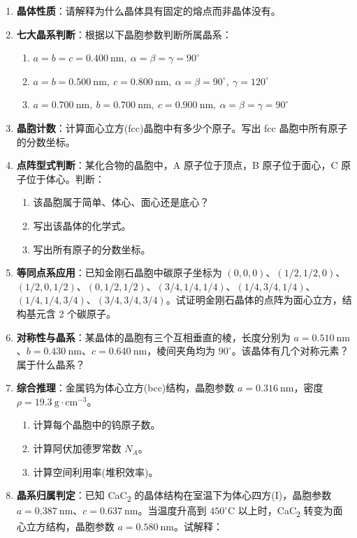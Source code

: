\begin{enumerate}
\def\labelenumi{\arabic{enumi}.}
\item
  \textbf{晶体性质}：请解释为什么晶体具有固定的熔点而非晶体没有。
\item
  \textbf{七大晶系判断}：根据以下晶胞参数判断所属晶系：

  \begin{enumerate}
  \def\labelenumii{(\arabic{enumii})}
  \tightlist
  \item
    \(a = b = c = 0.400\ \mathrm{nm},\ \alpha = \beta = \gamma = 90^\circ\)
  \item
    \(a = b = 0.500\ \mathrm{nm},\ c = 0.800\ \mathrm{nm},\ \alpha = \beta = 90^\circ,\ \gamma = 120^\circ\)
  \item
    \(a = 0.700\ \mathrm{nm},\ b = 0.700\ \mathrm{nm},\ c = 0.900\ \mathrm{nm},\ \alpha = \beta = \gamma = 90^\circ\)
  \end{enumerate}
\item
  \textbf{晶胞计数}：计算面心立方(fcc)晶胞中有多少个原子。写出 fcc 晶胞中所有原子的分数坐标。
\item
  \textbf{点阵型式判断}：某化合物的晶胞中，A 原子位于顶点，B 原子位于面心，C 原子位于体心。判断：

  \begin{enumerate}
  \def\labelenumii{(\arabic{enumii})}
  \tightlist
  \item
    该晶胞属于简单、体心、面心还是底心？
  \item
    写出该晶体的化学式。
  \item
    写出所有原子的分数坐标。
  \end{enumerate}
\item
  \textbf{等同点系应用}：已知金刚石晶胞中碳原子坐标为 \((0, 0, 0)\)、\((1/2, 1/2, 0)\)、\((1/2, 0, 1/2)\)、\((0, 1/2, 1/2)\)、\((3/4, 1/4, 1/4)\)、\((1/4, 3/4, 1/4)\)、\((1/4, 1/4, 3/4)\)、\((3/4, 3/4, 3/4)\)。试证明金刚石晶体的点阵为面心立方，结构基元含 2 个碳原子。
\item
  \textbf{对称性与晶系}：某晶体的晶胞有三个互相垂直的棱，长度分别为 \(a = 0.510\ \mathrm{nm}\)、\(b = 0.430\ \mathrm{nm}\)、\(c = 0.640\ \mathrm{nm}\)，棱间夹角均为 \(90^\circ\)。该晶体有几个对称元素？属于什么晶系？
\item
  \textbf{综合推理}：金属钨为体心立方(bcc)结构，晶胞参数 \(a = 0.316\ \mathrm{nm}\)，密度 \(\rho = 19.3\ \mathrm{g\cdot cm^{-3}}\)。

  \begin{enumerate}
  \def\labelenumii{(\arabic{enumii})}
  \tightlist
  \item
    计算每个晶胞中的钨原子数。
  \item
    计算阿伏加德罗常数 \(N_A\)。
  \item
    计算空间利用率(堆积效率)。
  \end{enumerate}
\item
  \textbf{晶系归属判定}：已知 CaC\textsubscript{2} 的晶体结构在室温下为体心四方(I)，晶胞参数 \(a = 0.387\ \mathrm{nm}\)、\(c = 0.637\ \mathrm{nm}\)。当温度升高到 \(450^\circ\mathrm{C}\) 以上时，CaC\textsubscript{2} 转变为面心立方结构，晶胞参数 \(a = 0.580\ \mathrm{nm}\)。试解释：


\end{enumerate}
